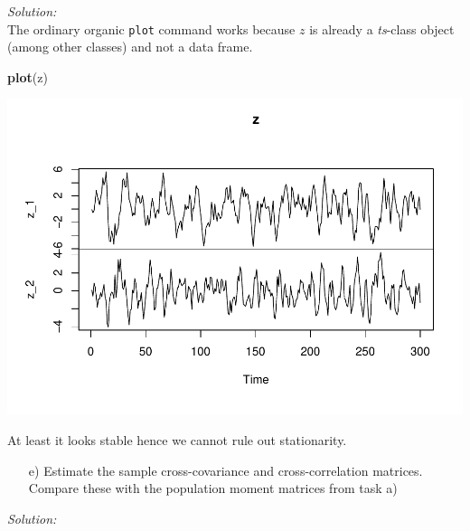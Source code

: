 \documentclass[12pt,a4paper]{article}
\newenvironment{Shaded}{\begin{snugshade}}{\end{snugshade}}
\newcommand{\KeywordTok}[1]{\textcolor[rgb]{0.13,0.29,0.53}{\textbf{#1}}}
\newcommand{\NormalTok}[1]{#1}
\begin{document}
\emph{Solution:}\\

The ordinary organic \texttt{plot} command works because \(z\) is
already a \emph{ts}-class object (among other classes) and not a data
frame.

\begin{Shaded}
\begin{Highlighting}[]
\KeywordTok{plot}\NormalTok{(z)}
\end{Highlighting}
\end{Shaded}

\includegraphics{exercise_2_files/figure-latex/unnamed-chunk-7-1.pdf}

At least it looks stable hence we cannot rule out stationarity.

\begin{itemize}
  \item[e)] Estimate the sample cross-covariance and cross-correlation matrices. Compare these with the population moment matrices from task a)
\end{itemize}

\emph{Solution:}
\end{document}
